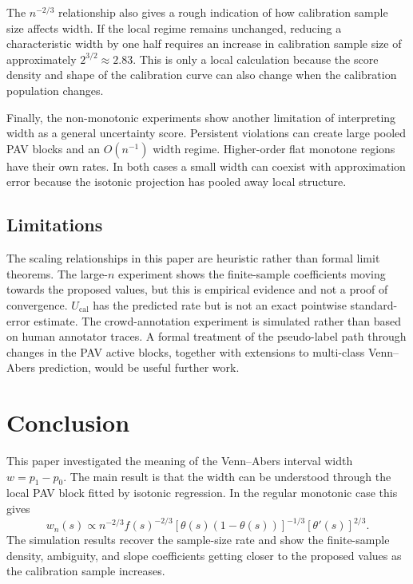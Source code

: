 \documentclass[11pt]{article}
\begin{document}
	The $n^{-2/3}$ relationship also gives a rough indication of how calibration sample size affects width. If the local regime remains unchanged, reducing a characteristic width by one half requires an increase in calibration sample size of approximately $2^{3/2}\approx2.83$. This is only a local calculation because the score density and shape of the calibration curve can also change when the calibration population changes.

	Finally, the non-monotonic experiments show another limitation of interpreting width as a general uncertainty score. Persistent violations can create large pooled PAV blocks and an $O(n^{-1})$ width regime. Higher-order flat monotone regions have their own rates. In both cases a small width can coexist with approximation error because the isotonic projection has pooled away local structure.

	\subsection{Limitations}
	The scaling relationships in this paper are heuristic rather than formal limit theorems. The large-$n$ experiment shows the finite-sample coefficients moving towards the proposed values, but this is empirical evidence and not a proof of convergence. $U_{\mathrm{cal}}$ has the predicted rate but is not an exact pointwise standard-error estimate. The crowd-annotation experiment is simulated rather than based on human annotator traces. A formal treatment of the pseudo-label path through changes in the PAV active blocks, together with extensions to multi-class Venn--Abers prediction, would be useful further work.

\section{Conclusion}
	\label{sec:conclusion}

	This paper investigated the meaning of the Venn--Abers interval width $w=p_1-p_0$. The main result is that the width can be understood through the local PAV block fitted by isotonic regression. In the regular monotonic case this gives
	\begin{equation}
		w_n(s)
		\propto
		n^{-2/3}f(s)^{-2/3}
		[\theta(s)(1-\theta(s))]^{-1/3}
		[\theta'(s)]^{2/3}.
	\end{equation}
	The simulation results recover the sample-size rate and show the finite-sample density, ambiguity, and slope coefficients getting closer to the proposed values as the calibration sample increases.
\end{document}
